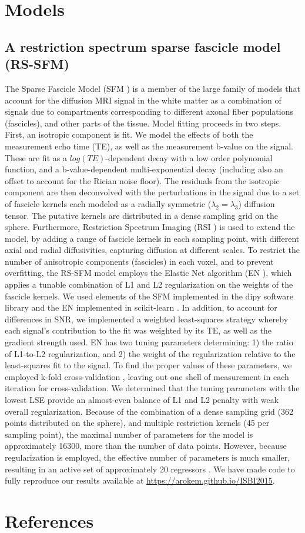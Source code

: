 \documentclass[3p]{elsarticle}
\begin{document}
\section{Models}

\subsection{A restriction spectrum sparse fascicle model (RS-SFM)}

The Sparse Fascicle Model (SFM \cite{Rokem2015}) is a member of the large family of models that account for the diffusion MRI signal in the white matter as a combination of signals due to compartments corresponding to different axonal fiber populations (fascicles), and other parts of the tissue. Model fitting proceeds in two steps. First, an isotropic component is fit. We model the effects of both the measurement echo time (TE), as well as the measurement b-value on the signal. These are fit as a $log(TE)$-dependent decay with a low order polynomial function, and a b-value-dependent multi-exponential decay (including also an offset to account for the Rician noise floor). The residuals from the isotropic component are then deconvolved with the perturbations in the signal due to a set of fascicle kernels each modeled as a radially symmetric ($\lambda_2=\lambda_3$) diffusion tensor. The putative kernels are distributed in a dense sampling grid on the sphere. Furthermore, Restriction Spectrum Imaging (RSI \cite{White2013}) is used to extend the model, by adding a range of fascicle kernels in each sampling point, with different axial and radial diffusivities, capturing diffusion at different scales. To restrict the number of anisotropic components (fascicles) in each voxel, and to prevent overfitting, the RS-SFM model employs the Elastic Net algorithm (EN \cite{Zou2005}), which applies a tunable combination of L1 and L2 regularization on the weights of the fascicle kernels. We used elements of the SFM implemented in the dipy software library \cite{Garyfallidis2014} and the EN implemented in scikit-learn \cite{pedregosa2011}. In addition, to account for differences in SNR, we implemented a weighted least-squares strategy whereby each signal’s contribution to the fit was weighted by its TE, as well as the gradient strength used. EN has two tuning parameters determining: 1) the ratio of L1-to-L2 regularization, and 2) the weight of the regularization relative to the least-squares fit to the signal. To find the proper values of these parameters, we employed k-fold cross-validation \cite{Rokem2015}, leaving out one shell of measurement in each iteration for cross-validation. We determined that the tuning parameters with the lowest LSE \cite{Panagiotaki2012} provide an almost-even balance of L1 and L2 penalty with weak overall regularization. Because of the combination of a dense sampling grid (362 points distributed on the sphere), and multiple restriction kernels (45 per sampling point), the maximal number of parameters for the model is approximately 16300, more than the number of data points. However, because regularization is employed, the effective number of parameters is much smaller, resulting in an active set of approximately 20 regressors \cite{Zou2007}. We have made code to fully reproduce our results available at \url{https://arokem.github.io/ISBI2015}. 

\section*{References}

\end{document}
